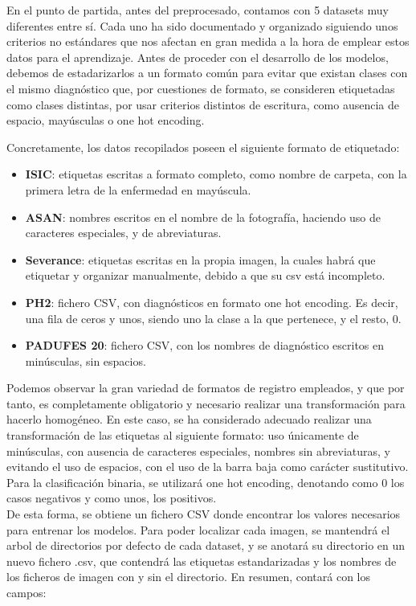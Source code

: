 En el punto de partida, antes del preprocesado, contamos con 5 datasets muy diferentes entre sí. Cada uno ha sido documentado y organizado siguiendo unos criterios no estándares que nos afectan en gran medida a la hora de emplear estos datos para el aprendizaje. Antes de proceder con el desarrollo de los modelos, debemos de estadarizarlos a un formato común para evitar que existan clases con el mismo diagnóstico que, por cuestiones de formato, se consideren etiquetadas como clases distintas, por usar criterios distintos de escritura, como ausencia de espacio, mayúsculas o one hot encoding. 

Concretamente, los datos recopilados poseen el siguiente formato de etiquetado:
\begin{itemize}
	\item \textbf{ISIC}: etiquetas escritas a formato completo, como nombre de carpeta, con la primera letra de la enfermedad en mayúscula.
	\item  \textbf{ASAN}: nombres escritos en el nombre de la fotografía, haciendo uso de caracteres especiales, y de abreviaturas.
	\item  \textbf{Severance}: etiquetas escritas en la propia imagen, la cuales habrá que etiquetar y organizar manualmente, debido a que su csv está incompleto.
	\item  \textbf{PH2}: fichero CSV, con diagnósticos en formato one hot encoding. Es decir, una fila de ceros y unos, siendo uno la clase a la que pertenece, y el resto, 0.
	\item  \textbf{PADUFES 20}: fichero CSV, con los nombres de diagnóstico escritos en minúsculas, sin espacios.
\end{itemize}

Podemos observar la gran variedad de formatos de registro empleados, y que por tanto, es completamente obligatorio y necesario realizar una transformación para hacerlo homogéneo. En este caso, se ha considerado adecuado realizar una transformación de las etiquetas al siguiente formato: uso únicamente de minúsculas, con ausencia de caracteres especiales, nombres sin abreviaturas, y evitando el uso de espacios, con el uso de la barra baja como carácter sustitutivo. Para la clasificación binaria, se utilizará one hot encoding, denotando como 0 los casos negativos y como unos, los positivos.\\


De esta forma, se obtiene un fichero CSV donde encontrar los valores necesarios para entrenar los modelos. Para poder localizar cada imagen, se mantendrá el arbol de directorios por defecto de cada dataset, y se anotará su directorio en un nuevo fichero .csv, que contendrá las etiquetas estandarizadas y los nombres de los ficheros de imagen con y sin el directorio. En resumen, contará con los campos:

